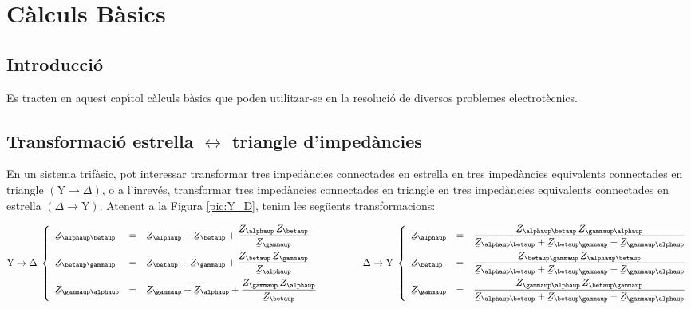 \chapter{C\`{a}lculs B\`{a}sics}\label{sec:calc_bas}

\section{Introducci\'{o}}
Es tracten en aquest cap\'{\i}tol c\`{a}lculs b\`{a}sics que poden utilitzar-se en la
resoluci\'{o} de diversos problemes electrot\`{e}cnics.

\section{\texorpdfstring{Transformaci\'{o} estrella $\boldsymbol{\leftrightarrow}$ triangle d'imped\`{a}ncies}
    {Transformaci\'{o} estrella-triangle d'imped\`{a}ncies}}\label{secc:d_y} 

En un sistema trif\`{a}sic, pot interessar transformar tres imped\`{a}ncies connectades en
estrella en tres imped\`{a}ncies equivalents connectades en triangle
$(\text{Y}\rightarrow\Delta)$, o a l'inrev\'{e}s, transformar tres imped\`{a}ncies connectades en
triangle en tres imped\`{a}ncies equivalents connectades en estrella
$(\Delta\rightarrow\text{Y})$. Atenent a la Figura \vref{pic:Y_D}, tenim les seg\"{u}ents
transformacions:

\begin{equation}\label{eq:Y_D}
   \text{Y}\rightarrow\Delta\;\left\{
   \begin{array}{lll}
      \cmplx{Z}_{\alphaup\betaup} &= &\displaystyle \cmplx{Z}_{\alphaup} + \cmplx{Z}_{\betaup} + \frac{\cmplx{Z}_{\alphaup}\,\cmplx{Z}_{\betaup}}{\cmplx{Z}_{\gammaup}}  \\[2.5ex]
      \cmplx{Z}_{\betaup\gammaup} &= &\displaystyle \cmplx{Z}_{\betaup} + \cmplx{Z}_{\gammaup} + \frac{\cmplx{Z}_{\betaup}\,\cmplx{Z}_{\gammaup}}{\cmplx{Z}_{\alphaup}}  \\[2.5ex]
      \cmplx{Z}_{\gammaup\alphaup} &= &\displaystyle \cmplx{Z}_{\gammaup} + \cmplx{Z}_{\alphaup} + \frac{\cmplx{Z}_{\gammaup}\, \cmplx{Z}_{\alphaup}}{\cmplx{Z}_{\betaup}}
   \end{array}
   \right.
   \qquad\qquad
   \Delta\rightarrow\text{Y}\;\left\{
   \begin{array}{lll}
      \cmplx{Z}_{\alphaup} &= &\dfrac{\cmplx{Z}_{\alphaup\betaup}\, \cmplx{Z}_{\gammaup\alphaup}}{  \cmplx{Z}_{\alphaup\betaup} + \cmplx{Z}_{\betaup\gammaup}+ \cmplx{Z}_{\gammaup\alphaup}}  \\[2.5ex]
      \cmplx{Z}_{\betaup} &= &\dfrac{\cmplx{Z}_{\betaup\gammaup}\, \cmplx{Z}_{\alphaup\betaup}}{  \cmplx{Z}_{\alphaup\betaup} + \cmplx{Z}_{\betaup\gammaup}+ \cmplx{Z}_{\gammaup\alphaup}}  \\[2.5ex]
      \cmplx{Z}_{\gammaup} &= &\dfrac{\cmplx{Z}_{\gammaup\alphaup}\, \cmplx{Z}_{\betaup\gammaup}}{  \cmplx{Z}_{\alphaup\betaup} + \cmplx{Z}_{\betaup\gammaup}+ \cmplx{Z}_{\gammaup\alphaup}}
   \end{array}
   \right.
\end{equation}

